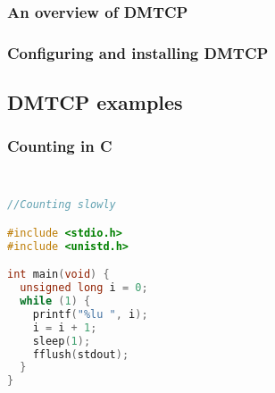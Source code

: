 \documentclass[compress]{beamer}
\begin{document}

\begin{frame}
\frametitle{An overview of DMTCP}



\end{frame}


\begin{frame}
\frametitle{Configuring and installing DMTCP}


\end{frame}


\subsection{DMTCP examples}   %


\begin{frame}[fragile]
\frametitle{Counting in C}

\begin{columns}[t]

\begin{lstlisting}[basicstyle=\ttfamily, language=C, showstringspaces=false]

//Counting slowly

#include <stdio.h>
#include <unistd.h>

int main(void) {
  unsigned long i = 0;
  while (1) {
    printf("%lu ", i);
    i = i + 1;
    sleep(1);
    fflush(stdout);
  } 
} 

\end{lstlisting}



\end{columns}

\end{frame}

\end{document}
